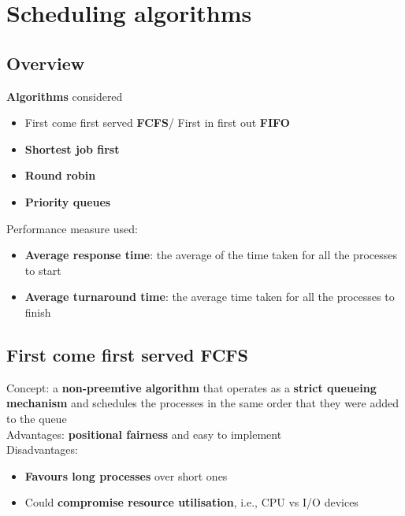 \documentclass{article}
\begin{document}
\section{Scheduling algorithms}

\subsection{Overview}
\begin{flushleft}
\textbf{Algorithms} considered
\begin{itemize}
	\item First come first served \textbf{FCFS}/ First in first out \textbf{FIFO}
	\item \textbf{Shortest job first}
	\item \textbf{Round robin}
	\item \textbf{Priority queues}
\end{itemize}
Performance measure used:
\begin{itemize}
	\item \textbf{Average response time}: the average of the time taken for all the processes to start
	\item \textbf{Average turnaround time}: the average time taken for all the processes to finish
\end{itemize}
\end{flushleft}

\subsection{First come first served FCFS}
\begin{flushleft}
Concept: a \textbf{non-preemtive algorithm} that operates as a \textbf{strict queueing mechanism} and schedules the processes in the same order that they were added to the queue\\
Advantages: \textbf{positional fairness} and easy to implement\\
Disadvantages:
\begin{itemize}
	\item \textbf{Favours long processes} over short ones
	\item Could \textbf{compromise resource utilisation}, i.e., CPU vs I/O devices
\end{itemize}
\end{flushleft}
\end{document}

